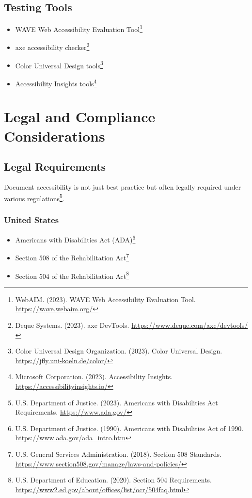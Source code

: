 \subsection{Testing Tools}
\begin{itemize}
\item WAVE Web Accessibility Evaluation Tool\footnote{WebAIM. (2023). WAVE Web Accessibility Evaluation Tool. \url{https://wave.webaim.org/}}
\item axe accessibility checker\footnote{Deque Systems. (2023). axe DevTools. \url{https://www.deque.com/axe/devtools/}}
\item Color Universal Design tools\footnote{Color Universal Design Organization. (2023). Color Universal Design. \url{https://jfly.uni-koeln.de/color/}}
\item Accessibility Insights tools\footnote{Microsoft Corporation. (2023). Accessibility Insights. \url{https://accessibilityinsights.io/}}
\end{itemize}

\section{Legal and Compliance Considerations}
\label{sec:legal-compliance}

\subsection{Legal Requirements}
Document accessibility is not just best practice but often legally required under various regulations\footnote{U.S. Department of Justice. (2023). Americans with Disabilities Act Requirements. \url{https://www.ada.gov/}}.

\subsubsection{United States}
\begin{itemize}
\item Americans with Disabilities Act (ADA)\footnote{U.S. Department of Justice. (1990). Americans with Disabilities Act of 1990. \url{https://www.ada.gov/ada_intro.htm}}
\item Section 508 of the Rehabilitation Act\footnote{U.S. General Services Administration. (2018). Section 508 Standards. \url{https://www.section508.gov/manage/laws-and-policies/}}
\item Section 504 of the Rehabilitation Act\footnote{U.S. Department of Education. (2020). Section 504 Requirements. \url{https://www2.ed.gov/about/offices/list/ocr/504faq.html}}
\end{itemize}

